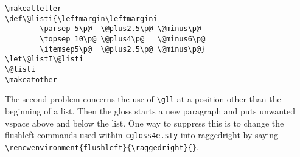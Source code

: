 \documentclass{article}
\begin{document}
\begin{verbatim}
\makeatletter
\def\@listi{\leftmargin\leftmargini
	    \parsep 5\p@  \@plus2.5\p@ \@minus\p@
	    \topsep 10\p@ \@plus4\p@   \@minus6\p@
	    \itemsep5\p@  \@plus2.5\p@ \@minus\p@}
\let\@listI\@listi
\@listi
\makeatother
\end{verbatim}
The second problem concerns the use of \verb.\gll.  at a position
other than the beginning of a list.  Then the gloss starts a new
paragraph and puts unwanted vspace above and below the list.  One way
to suppress this is to change the flushleft commands used within
{\tt cgloss4e.sty} into raggedright by saying 
\verb.\renewenvironment{flushleft}{\raggedright}{}..


\end{document}
